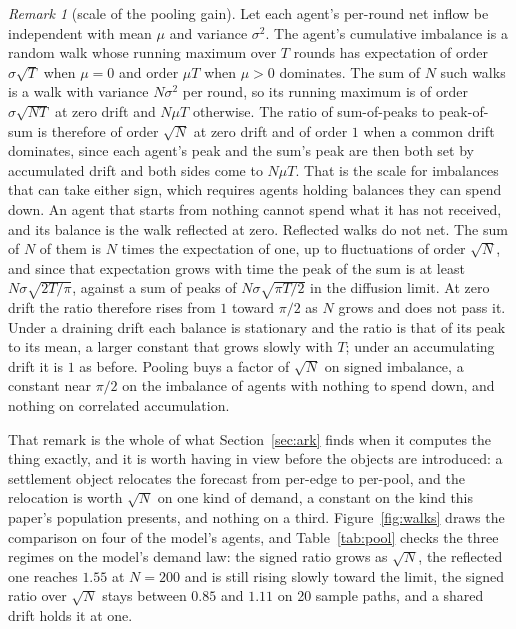 \documentclass[11pt]{article}
\theoremstyle{plain}
\theoremstyle{definition}
\theoremstyle{remark}
\newtheorem{remark}{Remark}
\begin{document}
\begin{remark}[scale of the pooling gain]
\label{rem:sqrtN}
Let each agent's per-round net inflow be independent with mean $\mu$ and variance $\sigma^2$. The agent's cumulative imbalance is a random walk whose running maximum over $T$ rounds has expectation of order $\sigma\sqrt T$ when $\mu=0$ and order $\mu T$ when $\mu>0$ dominates. The sum of $N$ such walks is a walk with variance $N\sigma^2$ per round, so its running maximum is of order $\sigma\sqrt{NT}$ at zero drift and $N\mu T$ otherwise. The ratio of sum-of-peaks to peak-of-sum is therefore of order $\sqrt N$ at zero drift and of order $1$ when a common drift dominates, since each agent's peak and the sum's peak are then both set by accumulated drift and both sides come to $N\mu T$. That is the scale for imbalances that can take either sign, which requires agents holding balances they can spend down. An agent that starts from nothing cannot spend what it has not received, and its balance is the walk reflected at zero. Reflected walks do not net. The sum of $N$ of them is $N$ times the expectation of one, up to fluctuations of order $\sqrt N$, and since that expectation grows with time the peak of the sum is at least $N\sigma\sqrt{2T/\pi}$, against a sum of peaks of $N\sigma\sqrt{\pi T/2}$ in the diffusion limit. At zero drift the ratio therefore rises from $1$ toward $\pi/2$ as $N$ grows and does not pass it. Under a draining drift each balance is stationary and the ratio is that of its peak to its mean, a larger constant that grows slowly with $T$; under an accumulating drift it is $1$ as before. Pooling buys a factor of $\sqrt N$ on signed imbalance, a constant near $\pi/2$ on the imbalance of agents with nothing to spend down, and nothing on correlated accumulation.
\end{remark}

That remark is the whole of what Section~\ref{sec:ark} finds when it computes the thing exactly, and it is worth having in view before the objects are introduced: a settlement object relocates the forecast from per-edge to per-pool, and the relocation is worth $\sqrt N$ on one kind of demand, a constant on the kind this paper's population presents, and nothing on a third. Figure~\ref{fig:walks} draws the comparison on four of the model's agents, and Table~\ref{tab:pool} checks the three regimes on the model's demand law: the signed ratio grows as $\sqrt N$, the reflected one reaches $1.55$ at $N=200$ and is still rising slowly toward the limit, the signed ratio over $\sqrt N$ stays between $0.85$ and $1.11$ on 20 sample paths, and a shared drift holds it at one.
\end{document}
